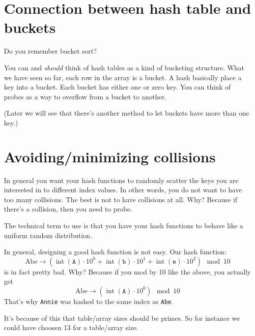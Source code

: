 












\newpage
\section{Connection between hash table and buckets}

Do you remember bucket sort?

You can and \textit{should} think of hash tables
as a kind of bucketing structure.
What we have seen so far, each row in the array is a bucket.
A hash basically place a key into a bucket.
Each bucket has either one or zero key.
You can think of probes as a way to overflow from a bucket to another.

(Later we will see that there's another method to let buckets
have more than one key.)




\newpage
\section{Avoiding/minimizing collisions}

In general you want your hash functions to randomly
scatter the keys you are interested in to different index values.
In other words, you do not want to have too many collisions.
The best is not to have collisions at all.
Why?
Because if there's a collision, then you need to probe.

The technical term to use is that you have your
hash functions to behave like a uniform random distribution.

In general, designing a good hash function is not easy.
Our hash function:
\[
\text{Abe}
\rightarrow
(\operatorname{int}(\texttt{A}) \cdot 10^0 +
\operatorname{int}(\texttt{b}) \cdot 10^1 +
\operatorname{int}(\texttt{e}) \cdot 10^2) 
\mod 10
\]
is in fact pretty bad.
Why?
Because if you mod by 10 like the above, you actually get
\[
\text{Abe}
\rightarrow
(\operatorname{int}(\texttt{A}) \cdot 10^0)
\mod 10
\]
That's why \verb!Annie! was hashed to the same index as \verb!Abe!.

It's because of this that table/array sizes should be primes.
So for instance we 
could have choosen 13 for a table/array size.




